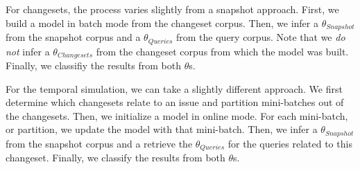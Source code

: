 For changesets, the process varies slightly from a snapshot approach.  First,
we build a model in batch mode from the changeset corpus.  Then, we infer a
$\theta_{Snapshot}$ from the snapshot corpus and a $\theta_{Queries}$ from the
query corpus.  Note that we \emph{do not} infer a $\theta_{Changesets}$ from
the changeset corpus from which the model was built.  Finally, we classifiy the
results from both $\theta$s.

\begin{comment}
\begin{enumerate}
    \item Build model from the changeset corpus in batch mode
    \item \emph{Do not} infer a $\theta_{Changesets}$
    \item Infer a $\theta_{Snapshot}$ from the snapshot corpus
    \item Infer a  $\theta_{Queries}$ from the query corpus
    \item Classify, or rank, the results from both $\theta$s
\end{enumerate}
\end{comment}


For the temporal simulation, we can take a slightly different approach.
We first determine which changesets relate to an issue and partition mini-batches out of the changesets.
Then, we initialize a model in online mode.
For each mini-batch, or partition, we update the model with that mini-batch.
Then, we infer a $\theta_{Snapshot}$ from the snapshot corpus
and a retrieve the $\theta_{Queries}$ for the queries related to this changeset.
Finally, we classify the results from both $\theta$s.

\begin{comment}
\begin{enumerate}
    \item Initialize a model in online mode
    \item Determine which changesets relate to an issue and partition mini-batches out of the changesets
    \item For each mini-batch:
        \begin{enumerate}
            \item Update the model with mini-batch
            \item Update $\theta_{Snapshot}$ with the new inference of the source code document affected by this changeset
            \item Infer a $\theta_{Query}$ of the query related to the changeset we stopped at
            \item Classify, or rank, the results from both $\theta$s
        \end{enumerate}
\end{enumerate}
\end{comment}

